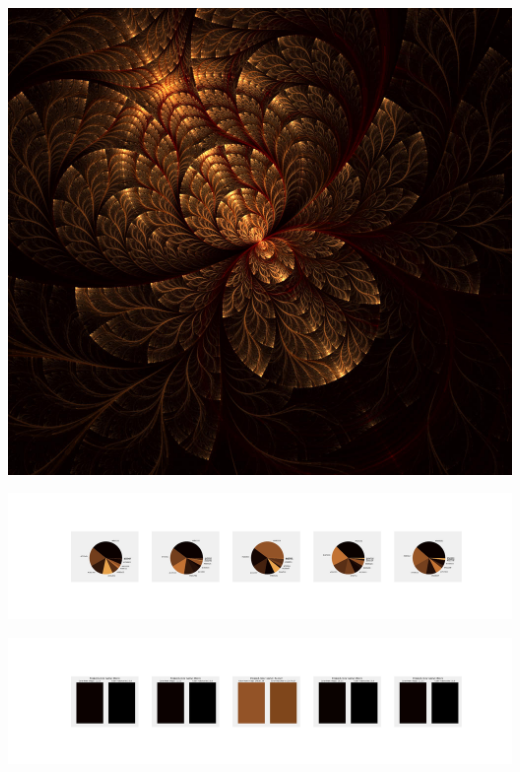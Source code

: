 \documentclass[11pt]{article}
\begin{document}
\begin{landscape}
    \begin{center}
    \includegraphics[width=\textwidth]{./nbimg/file (81).jpg}
    \end{center}

    \begin{center}
    \includegraphics[width=250mm]{./nbimg/pie-431.jpg}
    \end{center}

    \begin{center}
    \includegraphics[width=250mm]{./nbimg/peak-431.jpg}
    \end{center}
    


\end{landscape}
\end{document}
